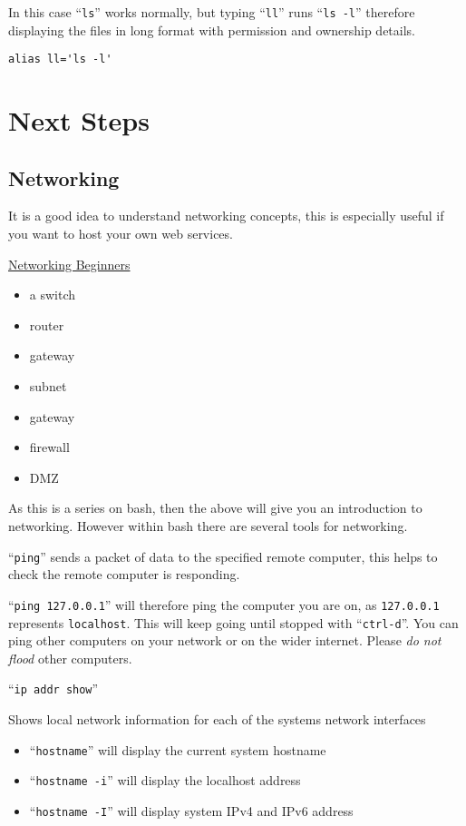 \documentclass{book}
\newcommand\youtube[2]{\href{https://invidious.snopyta.org/watch?v=#1}{#2}}
\begin{document}
In this case ``\verb|ls|'' works normally, but typing ``\verb|ll|'' runs ``\verb|ls -l|'' therefore displaying the files in long format with permission and ownership details.

\begin{verbatim}
alias ll='ls -l'
\end{verbatim}

\chapter{Next Steps}

\section{Networking}

It is a good idea to understand networking concepts, this is especially useful if you want to host your own web services.

\youtube{\_IOZ8\_cPgu8}{Networking Beginners}

\begin{itemize}
\item a switch
\item router
\item gateway
\item subnet
\item gateway
\item firewall
\item DMZ
\end{itemize}

As this is a series on bash, then the above will give you an introduction to networking. However within bash there are several tools for networking.

``\verb|ping|'' sends a packet of data to the specified remote computer, this helps to check the remote computer is responding.

``\verb|ping 127.0.0.1|'' will therefore ping the computer you are on, as \texttt{127.0.0.1} represents \texttt{localhost}. This will keep going until stopped with ``\verb|ctrl-d|''. You can ping other computers on your network or on the wider internet. Please \emph{do not flood} other computers.

``\verb|ip addr show|''

Shows local network information for each of the systems network interfaces

\begin{itemize}
\item ``\verb|hostname|'' will display the current system hostname
\item ``\verb|hostname -i|'' will display the localhost address
\item ``\verb|hostname -I|'' will display system IPv4 and IPv6 address
\end{itemize}
\end{document}
